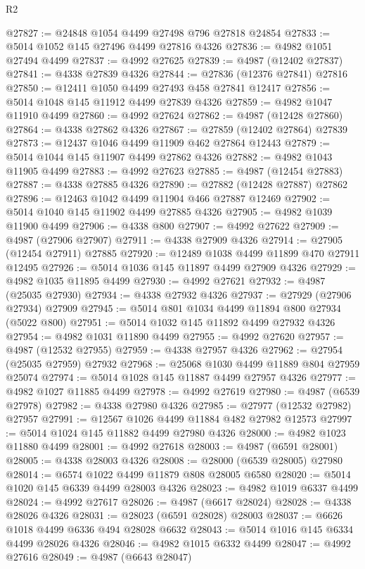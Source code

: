 \begin{lexlean}{R2}
\begin{coremodule}
@27827 := @24848 @1054 @4499 @27498 @796 @27818 @24854
@27833 := @5014 @1052 @145 @27496 @4499 @27816 @4326
@27836 := @4982 @1051 @27494 @4499
@27837 := @4992 @27625
@27839 := @4987 (@12402 @27837)
@27841 := @4338 @27839 @4326
@27844 := @27836 (@12376 @27841) @27816
@27850 := @12411 @1050 @4499 @27493 @458 @27841 @12417
@27856 := @5014 @1048 @145 @11912 @4499 @27839 @4326
@27859 := @4982 @1047 @11910 @4499
@27860 := @4992 @27624
@27862 := @4987 (@12428 @27860)
@27864 := @4338 @27862 @4326
@27867 := @27859 (@12402 @27864) @27839
@27873 := @12437 @1046 @4499 @11909 @462 @27864 @12443
@27879 := @5014 @1044 @145 @11907 @4499 @27862 @4326
@27882 := @4982 @1043 @11905 @4499
@27883 := @4992 @27623
@27885 := @4987 (@12454 @27883)
@27887 := @4338 @27885 @4326
@27890 := @27882 (@12428 @27887) @27862
@27896 := @12463 @1042 @4499 @11904 @466 @27887 @12469
@27902 := @5014 @1040 @145 @11902 @4499 @27885 @4326
@27905 := @4982 @1039 @11900 @4499
@27906 := @4338 @800
@27907 := @4992 @27622
@27909 := @4987 (@27906 @27907)
@27911 := @4338 @27909 @4326
@27914 := @27905 (@12454 @27911) @27885
@27920 := @12489 @1038 @4499 @11899 @470 @27911 @12495
@27926 := @5014 @1036 @145 @11897 @4499 @27909 @4326
@27929 := @4982 @1035 @11895 @4499
@27930 := @4992 @27621
@27932 := @4987 (@25035 @27930)
@27934 := @4338 @27932 @4326
@27937 := @27929 (@27906 @27934) @27909
@27945 := @5014 @801 @1034 @4499 @11894 @800 @27934 (@5022 @800)
@27951 := @5014 @1032 @145 @11892 @4499 @27932 @4326
@27954 := @4982 @1031 @11890 @4499
@27955 := @4992 @27620
@27957 := @4987 (@12532 @27955)
@27959 := @4338 @27957 @4326
@27962 := @27954 (@25035 @27959) @27932
@27968 := @25068 @1030 @4499 @11889 @804 @27959 @25074
@27974 := @5014 @1028 @145 @11887 @4499 @27957 @4326
@27977 := @4982 @1027 @11885 @4499
@27978 := @4992 @27619
@27980 := @4987 (@6539 @27978)
@27982 := @4338 @27980 @4326
@27985 := @27977 (@12532 @27982) @27957
@27991 := @12567 @1026 @4499 @11884 @482 @27982 @12573
@27997 := @5014 @1024 @145 @11882 @4499 @27980 @4326
@28000 := @4982 @1023 @11880 @4499
@28001 := @4992 @27618
@28003 := @4987 (@6591 @28001)
@28005 := @4338 @28003 @4326
@28008 := @28000 (@6539 @28005) @27980
@28014 := @6574 @1022 @4499 @11879 @808 @28005 @6580
@28020 := @5014 @1020 @145 @6339 @4499 @28003 @4326
@28023 := @4982 @1019 @6337 @4499
@28024 := @4992 @27617
@28026 := @4987 (@6617 @28024)
@28028 := @4338 @28026 @4326
@28031 := @28023 (@6591 @28028) @28003
@28037 := @6626 @1018 @4499 @6336 @494 @28028 @6632
@28043 := @5014 @1016 @145 @6334 @4499 @28026 @4326
@28046 := @4982 @1015 @6332 @4499
@28047 := @4992 @27616
@28049 := @4987 (@6643 @28047)

\end{coremodule}
\end{lexlean}
